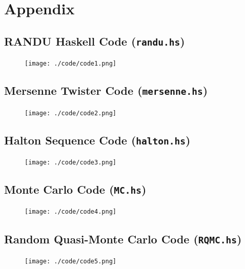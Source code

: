 \documentclass{article}
\begin{document}
\section{Appendix}
\subsection{RANDU Haskell Code (\texttt{randu.hs})}
    \begin{figure}[H]
        \begin{minipage}{\textwidth}
            \centering
            \texttt{[image: ./code/code1.png]}
        \end{minipage}
    \end{figure}

\subsection{Mersenne Twister Code (\texttt{mersenne.hs})}
    \begin{figure}[H]
        \begin{minipage}{\textwidth}
            \centering
            \texttt{[image: ./code/code2.png]}
        \end{minipage}
    \end{figure}

\subsection{Halton Sequence Code (\texttt{halton.hs})}
    \begin{figure}[H]
        \begin{minipage}{\textwidth}
            \centering
            \texttt{[image: ./code/code3.png]}
        \end{minipage}
    \end{figure}

\subsection{Monte Carlo Code (\texttt{MC.hs})}
    \begin{figure}[H]
        \begin{minipage}{\textwidth}
            \centering
            \texttt{[image: ./code/code4.png]}
        \end{minipage}
    \end{figure}

\subsection{Random Quasi-Monte Carlo Code (\texttt{RQMC.hs})}
    \begin{figure}[H]
        \begin{minipage}{\textwidth}
            \centering
            \texttt{[image: ./code/code5.png]}
        \end{minipage}
    \end{figure}
\end{document}
